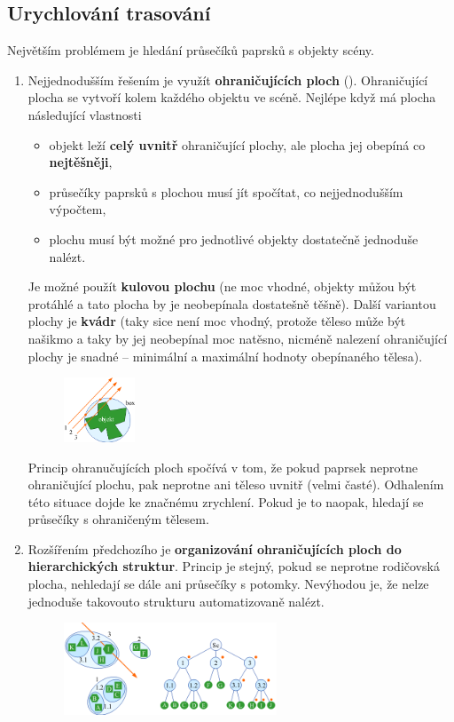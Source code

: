 \subsection{Urychlování trasování}
Největším problémem je hledání průsečíků paprsků s objekty scény.
\begin{enumerate}
\item Nejjednodušším řešením je využít \textbf{ohraničujících ploch} (). Ohraničující plocha se vytvoří kolem každého objektu ve scéně. Nejlépe když má plocha následující vlastnosti
\begin{itemize} 
	\item objekt leží \textbf{celý uvnitř} ohraničující plochy, ale plocha jej obepíná co \textbf{nejtěšněji},
	\item průsečíky paprsků s plochou musí jít spočítat, co nejjednodušším výpočtem,
	\item plochu musí být možné pro jednotlivé objekty dostatečně jednoduše nalézt.
\end{itemize}
Je možné použít \textbf{kulovou plochu} (ne moc vhodné, objekty můžou být protáhlé a tato plocha by je neobepínala dostatešně těšně). Další variantou plochy je \textbf{kvádr} (taky sice není moc vhodný, protože těleso může být našikmo a taky by jej neobepínal moc natěsno, nicméně nalezení ohraničující plochy je snadné -- minimální a maximální hodnoty obepínaného tělesa).
\begin{figure}[H]
\centering
\includegraphics[width=0.2\textwidth]{assets/6_boudingbox}
\end{figure}
Princip ohranučujících ploch spočívá v tom, že pokud paprsek neprotne ohraničující plochu, pak neprotne ani těleso uvnitř (velmi časté). Odhalením této situace dojde ke značnému zrychlení. Pokud je to naopak, hledají se průsečíky s ohraničeným tělesem.
\item Rozšířením předchozího je \textbf{organizování ohraničujících ploch do hierarchických struktur}. Princip je stejný, pokud se neprotne rodičovská plocha, nehledají se dále ani průsečíky s potomky. Nevýhodou je, že nelze jednoduše takovouto strukturu automatizovaně nalézt.
\begin{figure}[H]
\centering
\includegraphics[width=0.6\textwidth]{assets/6_organizovani_do_struktur}

\end{figure}
\end{enumerate}
